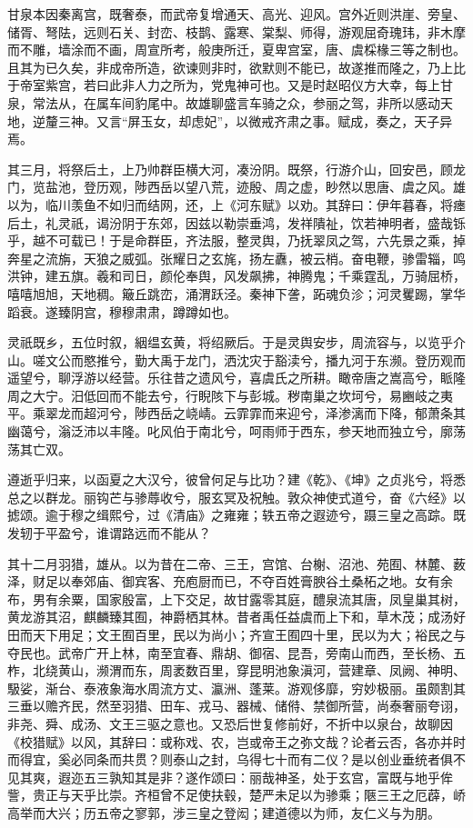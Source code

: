 \documentclass[12pt,UTF8]{ctexbook}
\begin{document}
甘泉本因秦离宫，既奢泰，而武帝复增通天、高光、迎风。宫外近则洪崖、旁皇、储胥、弩阹，远则石关、封峦、枝鹊、露寒、棠梨、师得，游观屈奇瑰玮，非木摩而不雕，墙涂而不画，周宣所考，般庚所迁，夏卑宫室，唐、虞棌椽三等之制也。且其为已久矣，非成帝所造，欲谏则非时，欲默则不能已，故遂推而隆之，乃上比于帝室紫宫，若曰此非人力之所为，党鬼神可也。又是时赵昭仪方大幸，每上甘泉，常法从，在属车间豹尾中。故雄聊盛言车骑之众，参丽之驾，非所以感动天地，逆釐三神。又言“屏玉女，却虑妃”，以微戒齐肃之事。赋成，奏之，天子异焉。



其三月，将祭后土，上乃帅群臣横大河，凑汾阴。既祭，行游介山，回安邑，顾龙门，览盐池，登历观，陟西岳以望八荒，迹殷、周之虚，眇然以思唐、虞之风。雄以为，临川羡鱼不如归而结网，还，上《河东赋》以劝。其辞曰：伊年暮春，将瘗后土，礼灵祇，谒汾阴于东郊，因兹以勒崇垂鸿，发祥隤祉，饮若神明者，盛哉铄乎，越不可载已！于是命群臣，齐法服，整灵舆，乃抚翠凤之驾，六先景之乘，掉奔星之流旃，天狼之威弧。张耀日之玄旄，扬左纛，被云梢。奋电鞭，骖雷辎，鸣洪钟，建五旗。羲和司日，颜伦奉舆，风发飙拂，神腾鬼；千乘霆乱，万骑屈桥，嘻嘻旭旭，天地稠。簸丘跳峦，涌渭跃泾。秦神下詟，跖魂负沴；河灵矍踢，掌华蹈衰。遂臻阴宫，穆穆肃肃，蹲蹲如也。



灵祇既乡，五位时叙，絪缊玄黄，将绍厥后。于是灵舆安步，周流容与，以览乎介山。嗟文公而愍推兮，勤大禹于龙门，洒沈灾于豁渎兮，播九河于东濒。登历观而遥望兮，聊浮游以经营。乐往昔之遗风兮，喜虞氏之所耕。瞰帝唐之嵩高兮，眽隆周之大宁。汨低回而不能去兮，行睨陔下与彭城。秽南巢之坎坷兮，易豳岐之夷平。乘翠龙而超河兮，陟西岳之峣崝。云霏霏而来迎兮，泽渗漓而下降，郁萧条其幽蔼兮，滃泛沛以丰隆。叱风伯于南北兮，呵雨师于西东，参天地而独立兮，廓荡荡其亡双。



遵逝乎归来，以函夏之大汉兮，彼曾何足与比功？建《乾》、《坤》之贞兆兮，将悉总之以群龙。丽钩芒与骖蓐收兮，服玄冥及祝触。敦众神使式道兮，奋《六经》以摅颂。逾于穆之缉熙兮，过《清庙》之雍雍；轶五帝之遐迹兮，蹑三皇之高踪。既发轫于平盈兮，谁谓路远而不能从？



其十二月羽猎，雄从。以为昔在二帝、三王，宫馆、台榭、沼池、苑囿、林麓、薮泽，财足以奉郊庙、御宾客、充庖厨而已，不夺百姓膏腴谷土桑柘之地。女有余布，男有余粟，国家殷富，上下交足，故甘露零其庭，醴泉流其唐，凤皇巢其树，黄龙游其沼，麒麟臻其囿，神爵栖其林。昔者禹任益虞而上下和，草木茂；成汤好田而天下用足；文王囿百里，民以为尚小；齐宣王囿四十里，民以为大；裕民之与夺民也。武帝广开上林，南至宜春、鼎胡、御宿、昆吾，旁南山而西，至长杨、五柞，北绕黄山，濒渭而东，周袤数百里，穿昆明池象滇河，营建章、凤阙、神明、馺娑，渐台、泰液象海水周流方丈、瀛洲、蓬莱。游观侈靡，穷妙极丽。虽颇割其三垂以赡齐民，然至羽猎、田车、戎马、器械、储偫、禁御所营，尚泰奢丽夸诩，非尧、舜、成汤、文王三驱之意也。又恐后世复修前好，不折中以泉台，故聊因《校猎赋》以风，其辞曰：或称戏、农，岂或帝王之弥文哉？论者云否，各亦并时而得宜，奚必同条而共贯？则泰山之封，乌得七十而有二仪？是以创业垂统者俱不见其爽，遐迩五三孰知其是非？遂作颂曰：丽哉神圣，处于玄宫，富既与地乎侔訾，贵正与天乎比崇。齐桓曾不足使扶毂，楚严未足以为骖乘；陿三王之厄薜，峤高举而大兴；历五帝之寥郭，涉三皇之登闳；建道德以为师，友仁义与为朋。
\end{document}
